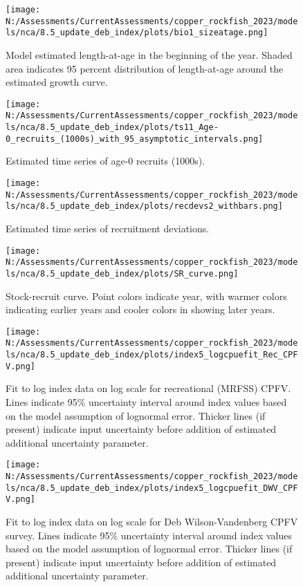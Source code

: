 \documentclass[11pt,
  english,
  letterpaper,
]{article}
\begin{document}
\begin{figure}
\centering
\texttt{[image: N:/Assessments/CurrentAssessments/copper\_rockfish\_2023/models/nca/8.5\_update\_deb\_index/plots/bio1\_sizeatage.png]}
\caption{Model estimated length-at-age in the beginning of the year. Shaded area indicates 95 percent distribution of length-at-age around the estimated growth curve.\label{fig:mod-est-len-age}}
\end{figure}

\begin{figure}
\centering
\texttt{[image: N:/Assessments/CurrentAssessments/copper\_rockfish\_2023/models/nca/8.5\_update\_deb\_index/plots/ts11\_Age-0\_recruits\_(1000s)\_with\_95\_asymptotic\_intervals.png]}
\caption{Estimated time series of age-0 recruits (1000s).\label{fig:recruits}}
\end{figure}

\begin{figure}
\centering
\texttt{[image: N:/Assessments/CurrentAssessments/copper\_rockfish\_2023/models/nca/8.5\_update\_deb\_index/plots/recdevs2\_withbars.png]}
\caption{Estimated time series of recruitment deviations.\label{fig:rec-devs}}
\end{figure}

\begin{figure}
\centering
\texttt{[image: N:/Assessments/CurrentAssessments/copper\_rockfish\_2023/models/nca/8.5\_update\_deb\_index/plots/SR\_curve.png]}
\caption{Stock-recruit curve. Point colors indicate year, with warmer colors indicating earlier years and cooler colors in showing later years.\label{fig:bh-curve}}
\end{figure}

\begin{figure}
\centering
\texttt{[image: N:/Assessments/CurrentAssessments/copper\_rockfish\_2023/models/nca/8.5\_update\_deb\_index/plots/index5\_logcpuefit\_Rec\_CPFV.png]}
\caption{Fit to log index data on log scale for recreational (MRFSS) CPFV. Lines indicate 95\% uncertainty interval around index values based on the model assumption of lognormal error. Thicker lines (if present) indicate input uncertainty before addition of estimated additional uncertainty parameter.\label{fig:mrfss-cpfv-index-fit}}
\end{figure}

\begin{figure}
\centering
\texttt{[image: N:/Assessments/CurrentAssessments/copper\_rockfish\_2023/models/nca/8.5\_update\_deb\_index/plots/index5\_logcpuefit\_DWV\_CPFV.png]}
\caption{Fit to log index data on log scale for Deb Wilson-Vandenberg CPFV survey. Lines indicate 95\% uncertainty interval around index values based on the model assumption of lognormal error. Thicker lines (if present) indicate input uncertainty before addition of estimated additional uncertainty parameter.\label{fig:dwv-cpfv-index-fit}}
\end{figure}
\end{document}
